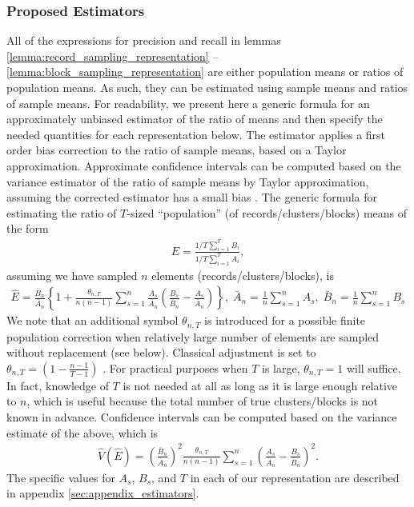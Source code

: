 \documentclass[fontsize=11pt]{article}
\theoremstyle{definition}
\begin{document}
\subsubsection{Proposed Estimators}

All of the expressions for precision and recall in lemmas \ref{lemma:record_sampling_representation} -- \ref{lemma:block_sampling_representation} are either population means or ratios of population means. As such, they can be estimated using sample means and ratios of sample means. For readability, we present here a generic formula for an approximately unbiased estimator of the ratio of means and then specify the needed quantities for each representation below. The estimator applies a first order bias correction to the ratio of sample means, based on a Taylor approximation. Approximate confidence intervals can be computed based on the variance estimator of the ratio of sample means by Taylor approximation, assuming the corrected estimator has a small bias \citep{fuller2011sampling}. The generic formula for estimating the ratio of $T$-sized ``population'' (of records/clusters/blocks) means of the form
\begin{align}
    E=\frac{1/T\sum_{i=1}^{T} B_i}{1/T\sum_{i=1}^T A_i},
\end{align}
assuming we have sampled $n$ elements (records/clusters/blocks), is
\begin{align}\label{eq:bias_adjustment}
    \widehat{E} = \frac{\bar{B}_n}{\bar{A}_n} \left\{ 1 + \frac{\theta_{n,T}}{n(n-1)} \sum_{s=1}^n \frac{A_s}{\bar{A}_n} \left(\frac{B_s}{\bar{B}_n} - \frac{A_s}{\bar{A}_n} \right) \right\}, \; \bar{A}_n = \frac{1}{n} \sum_{s=1}^{n} A_s, \; \bar{B}_n = \frac{1}{n} \sum_{s=1}^{n} B_s
\end{align}
We note that an additional symbol $\theta_{n,T}$ is introduced for a possible finite population correction when relatively large number of elements are sampled without replacement (see below). Classical adjustment is set to $\theta_{n,T} = (1 - \frac{n-1}{T-1})$ \citep{Cochran1977}. For practical purposes when $T$ is large, $\theta_{n,T}=1$ will suffice. In fact, knowledge of $T$ is not needed at all as long as it is large enough relative to $n$, which is useful because the total number of true clusters/blocks is not known in advance. Confidence intervals can be computed based on the variance estimate of the above, which is
\begin{align} \label{eq:estimated_variance}
    \widehat{V}(\widehat{E}) = \left( \frac{\bar{B}_n}{\bar{A}_n} \right)^2 \frac{\theta_{n,T}}{n(n-1)} \sum_{s=1}^n \left( \frac{A_s}{\bar{A}_n} - \frac{B_s}{\bar{B}_n}\right)^2.
\end{align}
The specific values for $A_s$, $B_s$, and $T$ in each of our representation are described in appendix \ref{sec:appendix_estimators}.
\end{document}
